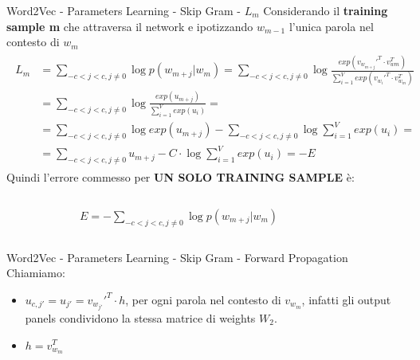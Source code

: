 \documentclass[british]{beamer}
\begin{document}
\begin{frame}{Word2Vec - Parameters Learning - Skip Gram - \(L_m\)}
	Considerando il \textbf{training sample m} che attraversa il network e ipotizzando \(w_{m-1}\) l'unica parola nel contesto di \(w_{m}\)
	\begin{gather*}
		\begin{split}
		L_m &= \sum_{-c<j<c,j\neq0}\log p(w_{m+j}|w_{m}) =
		\sum_{-c<j<c,j\neq0} \log \frac{exp(v_{w_{m+j}}'^T \cdot v_{w{m}}^T)}{\sum_{i=1}^{V} exp(v_{w_{i}}'^T \cdot v_{w_{m}}^T)} 
		\\
		&= \sum_{-c<j<c,j\neq0} \log \frac{exp(u_{m+j})}{\sum_{i=1}^{V} exp(u_i)} = 
		\\
		&= \sum_{-c<j<c,j\neq0} \log exp(u_{m+j}) - \sum_{-c<j<c,j\neq0} \log \sum_{i=1}^{V} exp(u_i) =
		\\
		&= \sum_{-c<j<c,j\neq0} u_{m+j} - C \cdot \log \sum_{i=1}^{V} exp(u_i) = -E
		\end{split}
	\end{gather*}
	Quindi l'errore commesso per \textbf{UN SOLO TRAINING SAMPLE} \`{e}:
	\begin{columns}
		\begin{column}{0.2\textwidth}
			
		\end{column}
		\begin{column}{0.6\textwidth}
			\(E = - \sum_{-c<j<c,j\neq0}\log p(w_{m+j}|w_{m})\)
		\end{column}
		\begin{column}{0.2\textwidth}
			
		\end{column}
	\end{columns}
\end{frame}

\begin{frame}{Word2Vec - Parameters Learning - Skip Gram - Forward Propagation}
	Chiamiamo:
	\begin{itemize}
		\item \(u_{c,j'} = u_{j'} = v_{w_{j'}}'^T \cdot h \), per ogni parola nel contesto di \(v_{w_{m}}\), infatti gli output panels condividono la stessa matrice di weights \(W_2\).
		\item \(h = v_{w_{m}}^T\)
	\end{itemize} 
\end{frame}
\end{document}
